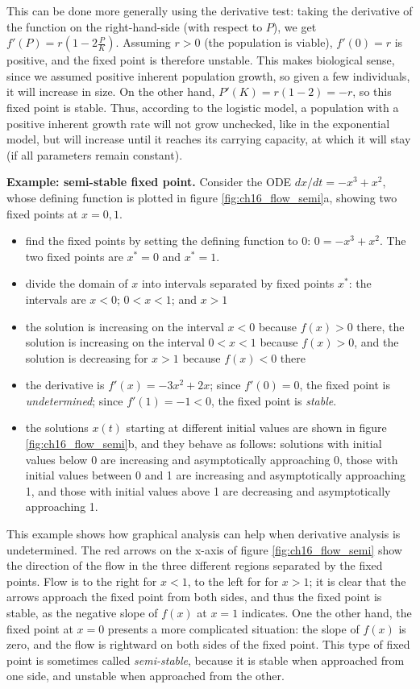 \documentclass[
  letterpaper,
  DIV=11,
  numbers=noendperiod]{scrreprt}
\begin{document}
This can be done more generally using the derivative test: taking the
derivative of the function on the right-hand-side (with respect to
\(P\)), we get \(f'(P) = r(1-2\frac{P}{K})\). Assuming \(r>0\) (the
population is viable), \(f'(0)= r\) is positive, and the fixed point is
therefore unstable. This makes biological sense, since we assumed
positive inherent population growth, so given a few individuals, it will
increase in size. On the other hand, \(P'(K) = r(1-2) = -r\), so this
fixed point is stable. Thus, according to the logistic model, a
population with a positive inherent growth rate will not grow unchecked,
like in the exponential model, but will increase until it reaches its
carrying capacity, at which it will stay (if all parameters remain
constant).

\textbf{Example: semi-stable fixed point.} Consider the ODE
\(dx/dt = -x^3 + x^2\), whose defining function is plotted in figure
\ref{fig:ch16_flow_semi}a, showing two fixed points at \(x = 0, 1\).

\begin{itemize}
\item
  find the fixed points by setting the defining function to 0:
  \(0 = -x^3 + x^2\). The two fixed points are \(x^*=0\) and \(x^*=1\).
\item
  divide the domain of \(x\) into intervals separated by fixed points
  \(x^*\): the intervals are \(x<0\); \(0<x<1\); and \(x>1\)
\item
  the solution is increasing on the interval \(x<0\) because \(f(x)>0\)
  there, the solution is increasing on the interval \(0<x<1\) because
  \(f(x)>0\), and the solution is decreasing for \(x>1\) because
  \(f(x)<0\) there
\item
  the derivative is \(f'(x)=-3x^2+2x\); since \(f'(0)=0\), the fixed
  point is \emph{undetermined}; since \(f'(1)=-1<0\), the fixed point is
  \emph{stable}.
\item
  the solutions \(x(t)\) starting at different initial values are shown
  in figure \ref{fig:ch16_flow_semi}b, and they behave as follows:
  solutions with initial values below 0 are increasing and
  asymptotically approaching 0, those with initial values between 0 and
  1 are increasing and asymptotically approaching 1, and those with
  initial values above 1 are decreasing and asymptotically approaching
  1.
\end{itemize}

This example shows how graphical analysis can help when derivative
analysis is undetermined. The red arrows on the x-axis of figure
\ref{fig:ch16_flow_semi} show the direction of the flow in the three
different regions separated by the fixed points. Flow is to the right
for \(x<1\), to the left for for \(x>1\); it is clear that the arrows
approach the fixed point from both sides, and thus the fixed point is
stable, as the negative slope of \(f(x)\) at \(x=1\) indicates. One the
other hand, the fixed point at \(x=0\) presents a more complicated
situation: the slope of \(f(x)\) is zero, and the flow is rightward on
both sides of the fixed point. This type of fixed point is sometimes
called \emph{semi-stable}, because it is stable when approached from one
side, and unstable when approached from the other.
\end{document}
